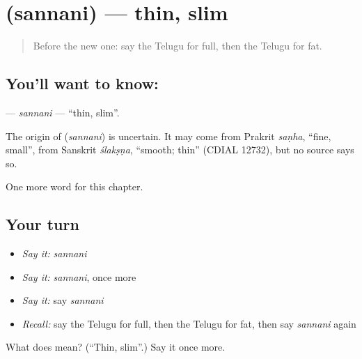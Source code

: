 \section[\texorpdfstring{\te{సన్నని} (sannani)}{సన్నని (sannani)}]{ (sannani) — thin, slim}

\label{lesson:TE-C220-sannani}



\begin{quote}
Before the new one: say the Telugu for full, then the Telugu for fat.
\end{quote}

\subsection*{You'll want to know: }
\textbf{} — \emph{sannani} — \textquotedblleft{}thin, slim\textquotedblright{}.

\begin{cousinweb}
The origin of \textbf{} (\emph{sannani}) is uncertain. It may come from Prakrit \emph{saṇha}, \textquotedblleft{}fine, small\textquotedblright{}, from Sanskrit \emph{ślakṣṇa}, \textquotedblleft{}smooth; thin\textquotedblright{} (CDIAL 12732), but no source says so.
\end{cousinweb}

\begin{grammarlens}[title={What you've built}]
One more word for this chapter.
\end{grammarlens}

\subsection*{Your turn}
\begin{itemize}
\raggedright
  \item \emph{Say it:} \emph{sannani}
  \item \emph{Say it:} \emph{sannani}, once more
  \item \emph{Say it:} say \emph{sannani}
  \item \emph{Recall:} say the Telugu for full, then the Telugu for fat, then say \emph{sannani} again
\end{itemize}

\begin{tcolorbox}[breakable,colback=teal!4,colframe=teal!35!black,title={Before you move on}]
What does  mean? (\textquotedblleft{}Thin, slim\textquotedblright{}.) Say it once more.
\end{tcolorbox}
